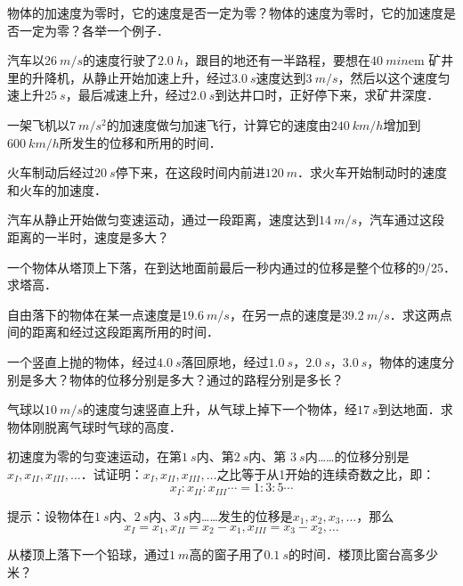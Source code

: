 \begin{QsNum}
    \item 物体的加速度为零时，它的速度是否一定为零？物体的速度为零时，它的加速度是否一定为零？各举一个例子．
    \item 汽车以$\qty{26}{m/s}$的速度行驶了$\qty{2.0}{h}$，跟目的地还有一半路程，要想在$\qty{40}{min}$em 矿井里的升降机，从静止开始加速上升，经过$\qty{3.0}{s}$速度达到$\qty{3}{m/s}$，然后以这个速度匀速上升$\qty{25}{s}$，最后减速上升，经过$\qty{2.0}{s}$到达井口时，正好停下来，求矿井深度．
    \item 一架飞机以$\qty{7}{m/s^2}$的加速度做匀加速飞行，计算它的速度由$\qty{240}{km/h}$增加到$\qty{600}{km/h}$所发生的位移和所用的时间．
    \item 火车制动后经过$\qty{20}{s}$停下来，在这段时间内前进$\qty{120}{m}$．求火车开始制动时的速度和火车的加速度．
    \item 汽车从静止开始做匀变速运动，通过一段距离，速度达到$\qty{14}{m/s}$，汽车通过这段距离的一半时，速度是多大？
    \item 一个物体从塔顶上下落，在到达地面前最后一秒内通过的位移是整个位移的9/25．求塔高．
    \item 自由落下的物体在某一点速度是$\qty{19.6}{m/s}$，在另一点的速度是$\qty{39.2}{m/s}$．求这两点间的距离和经过这段距离所用的时间．
    \item 一个竖直上抛的物体，经过$\qty{4.0}{s}$落回原地，经过$\qty{1.0}{s}$，$\qty{2.0}{s}$，$\qty{3.0}{s}$，物体的速度分别是多大？物体的位移分别是多大？通过的路程分别是多长？
    \item 气球以$\qty{10}{m/s}$的速度匀速竖直上升，从气球上掉下一个物体，经$\qty{17}{s}$到达地面．求物体刚脱离气球时气球的高度．
    \item 初速度为零的匀变速运动，在第$\qty{1}{s}$内、第$\qty{2}{s}$内、第
          $\qty{3}{s}$内……的位移分别是$x_I,x_{II},x_{III},\ldots$．试证明：$x_I,x_{II},x_{III},\ldots$之比等于从1开始的连续奇数之比，即：
          $$x_I:x_{II}:x_{III}\cdots=1:3:5\cdots$$

          提示：设物体在$\qty{1}{s}$内、$\qty{2}{s}$内、$\qty{3}{s}$内……发生的位移是$x_1,x_2,x_3,\ldots$，那么$$x_I=x_1, x_{II}=x_2-x_1, x_{III}=x_3-x_2,\ldots$$
    \item 从楼顶上落下一个铅球，通过$\qty{1}{m}$高的窗子用了$\qty{0.1}{s}$的时间．楼顶比窗台高多少米？
\end{QsNum}



































